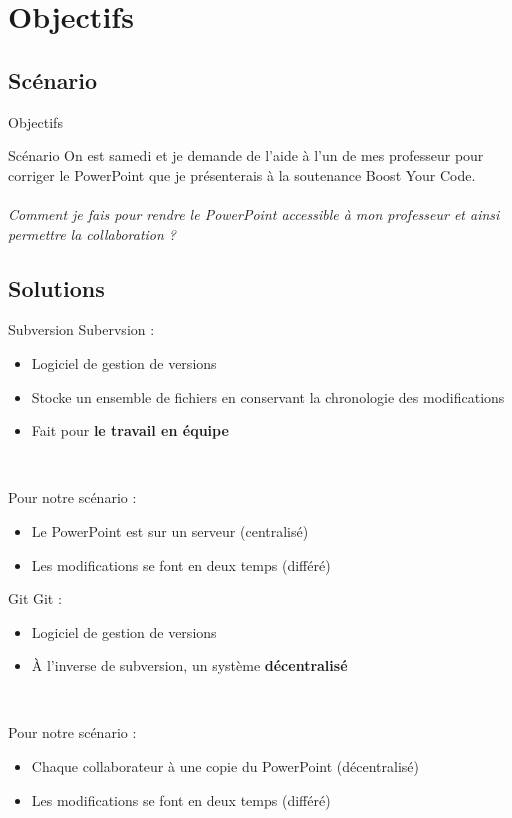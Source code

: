 \section{Objectifs}

\subsection{Scénario}
\begin{frame}{Objectifs}
  \begin{block}{Scénario}
  On est samedi et je demande de l'aide à l'un de mes professeur pour corriger 
  le PowerPoint que je présenterais à la soutenance Boost Your Code.\\
  ~\\
  \emph{Comment je fais pour rendre le PowerPoint accessible à mon professeur et
  ainsi permettre la collaboration ?}
  \end{block}
\end{frame}

\subsection{Solutions}
\begin{frame}{Subversion}
  Subervsion :
  \begin{itemize}
    \item Logiciel de gestion de versions
    \item Stocke un ensemble de fichiers en conservant la chronologie des
    modifications
    \item Fait pour \textbf{le travail en équipe}
  \end{itemize}~

  Pour notre scénario :
  \begin{itemize}
    \item Le PowerPoint est sur un serveur (centralisé)
    \item Les modifications se font en deux temps (différé)
  \end{itemize}
\end{frame}

\begin{frame}{Git}
  Git :
  \begin{itemize}
    \item Logiciel de gestion de versions
    \item À l'inverse de subversion, un système \textbf{décentralisé} 
  \end{itemize}~

  Pour notre scénario :
  \begin{itemize}
    \item Chaque collaborateur à une copie du PowerPoint (décentralisé)
    \item Les modifications se font en deux temps (différé)
  \end{itemize}
\end{frame}

